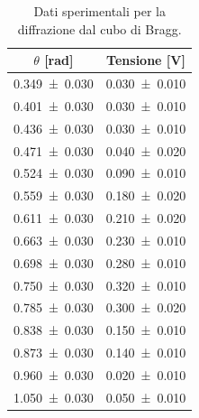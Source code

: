 \documentclass[a4paper]{article}
\begin{document}
\begin{table}[htbp]
\centering
\caption{Dati sperimentali per la diffrazione dal cubo di Bragg.}
\label{tab:dati_bragg}
\begin{tabular}{|c|c|}
\hline
$\theta$ [\si{\radian}] & Tensione [\si{\volt}] \\\hline\hline
\SI{0.349 \pm 0.030}{} & \SI{0.030 \pm 0.010}{} \\ %
\SI{0.401 \pm 0.030}{} & \SI{0.030 \pm 0.010}{} \\ %
\SI{0.436 \pm 0.030}{} & \SI{0.030 \pm 0.010}{} \\ %
\SI{0.471 \pm 0.030}{} & \SI{0.040 \pm 0.020}{} \\ %
\SI{0.524 \pm 0.030}{} & \SI{0.090 \pm 0.010}{} \\ %
\SI{0.559 \pm 0.030}{} & \SI{0.180 \pm 0.020}{} \\ %
\SI{0.611 \pm 0.030}{} & \SI{0.210 \pm 0.020}{} \\ %
\SI{0.663 \pm 0.030}{} & \SI{0.230 \pm 0.010}{} \\ %
\SI{0.698 \pm 0.030}{} & \SI{0.280 \pm 0.010}{} \\ %
\SI{0.750 \pm 0.030}{} & \SI{0.320 \pm 0.010}{} \\ %
\SI{0.785 \pm 0.030}{} & \SI{0.300 \pm 0.020}{} \\ %
\SI{0.838 \pm 0.030}{} & \SI{0.150 \pm 0.010}{} \\ %
\SI{0.873 \pm 0.030}{} & \SI{0.140 \pm 0.010}{} \\ %
\SI{0.960 \pm 0.030}{} & \SI{0.020 \pm 0.010}{} \\ %
\SI{1.050 \pm 0.030}{} & \SI{0.050 \pm 0.010}{} \\ %
\hline
\end{tabular}
\end{table}
\end{document}

